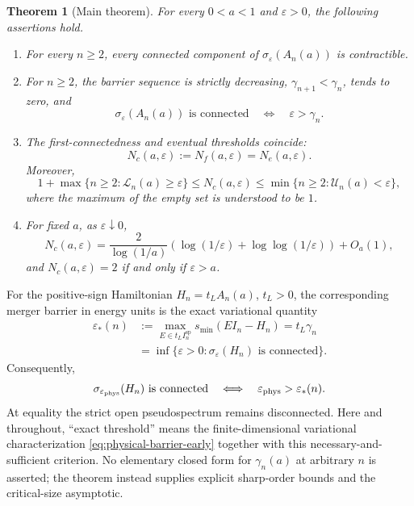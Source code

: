 \documentclass[12pt,anonymous]{iopjournal}
\numberwithin{equation}{section}
\newtheorem{theorem}{Theorem}[section]
\theoremstyle{remark}
\begin{document}
\begin{theorem}[Main theorem]\label{thm:main}
For every $0<a<1$ and $\varepsilon>0$, the following assertions hold.
\begin{enumerate}
\item For every $n\geq2$, every connected component of
$\sigma_\varepsilon(A_n(a))$ is
contractible.
\item For $n\geq2$, the barrier sequence is strictly decreasing,
$\gamma_{n+1}<\gamma_n$, tends to zero, and
\[
 \sigma_\varepsilon(A_n(a))\text{ is connected}
 \quad\Longleftrightarrow\quad \varepsilon>\gamma_n.
\]
\item The first-connectedness and eventual thresholds coincide:
\[
 N_c(a,\varepsilon):=N_f(a,\varepsilon)=N_e(a,\varepsilon).
\]
Moreover,
\begin{equation}\label{eq:N-two-sided-main}
 1+\max\{n\geq2:\mathcal L_n(a)\geq\varepsilon\}
 \leq N_c(a,\varepsilon)\leq
 \min\{n\geq2:\mathcal U_n(a)<\varepsilon\},
\end{equation}
where the maximum of the empty set is understood to be $1$.
\item For fixed $a$, as $\varepsilon\downarrow0$,
\begin{equation}\label{eq:N-asymptotic-main}
 N_c(a,\varepsilon)=\frac{2}{\log(1/a)}
 \left(\log(1/\varepsilon)+\log\!\log(1/\varepsilon)\right)+O_a(1),
\end{equation}
and $N_c(a,\varepsilon)=2$ if and only if $\varepsilon>a$.
\end{enumerate}
\end{theorem}

For the positive-sign Hamiltonian \(H_n=t_LA_n(a)\), \(t_L>0\), the
corresponding merger barrier in energy units is the exact variational
quantity
\begin{equation}\label{eq:physical-barrier-early}
 \boxed{\begin{aligned}
 \varepsilon_*(n)
 &:=
 \max_{E\in t_L I_n^{\mathrm{sp}}}
 s_{\min}(EI_n-H_n)
 =t_L\gamma_n\\
 &=\inf\{\varepsilon>0:
 \sigma_\varepsilon(H_n)\text{ is connected}\}.
 \end{aligned}}
\end{equation}
Consequently,
\[
 \sigma_{\varepsilon_{\rm phys}}(H_n)\text{ is connected}
 \quad\Longleftrightarrow\quad
 \varepsilon_{\rm phys}>\varepsilon_*(n).
\]
At equality the strict open pseudospectrum remains disconnected.
Here and throughout, ``exact threshold'' means the finite-dimensional
variational characterization \eqref{eq:physical-barrier-early} together
with this necessary-and-sufficient criterion.  No elementary closed form
for \(\gamma_n(a)\) at arbitrary \(n\) is asserted; the theorem instead
supplies explicit sharp-order bounds and the critical-size asymptotic.
\end{document}
